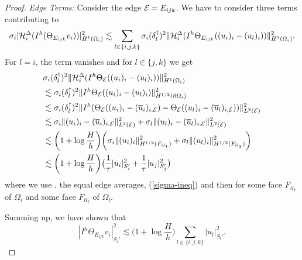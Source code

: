 \begin{proof}
    \textit{Edge Terms:} Consider the edge $\mathcal{E} = E_{ijk}$. We have to consider three terms contributing to
    \begin{equation}
        \label{full-edge}
        \sigma_i |\mathcal{H}_i^{\Delta} (I^h(\Theta_{E_{ijk}} v_i))|_{H^1(\Omega_i)}^2 \lesssim \sum_{l \in \{i,j,k\}} \sigma_i (\delta_l^{\dag})^2 \|\mathcal{H}_i^{\Delta}(I^h \Theta_{E_{ijk}}((u_i)_i - (u_l)_i))\|_{H^1(\Omega_i)}^2.
    \end{equation}
    For $l = i$, the term vanishes and for $l \in \{j,k\}$ we get
    \begin{equation*}
        \begin{split}
            & \sigma_i (\delta_l^{\dag})^2 \|\mathcal{H}_i^{\Delta}(I^h \Theta_{\mathcal{E}}((u_i)_i - (u_l)_i))\|_{H^1(\Omega_i)}^2 \\
            & \lesssim \sigma_i (\delta_l^{\dag})^2 \|I^h \Theta_{\mathcal{E}}((u_i)_i - (u_l)_i)\|_{H^{1 / 2}(\partial \Omega_i)}^2 \\
            & \lesssim \sigma_i (\delta_l^{\dag})^2 \|I^h(\Theta_{\mathcal{E}}((u_i)_i - (\overline{u}_i)_{i, \mathcal{E}}) - \Theta_{\mathcal{E}}((u_l)_i - (\overline{u}_l)_{i, \mathcal{E}}))\|_{L^2(\mathcal{E})}^2 \\
            & \lesssim \sigma_i \| (u_i)_i - (\overline{u}_i)_{i, \mathcal{E}}\|_{L^2(\mathcal{E})}^2 + \sigma_l \| (u_l)_i - (\overline{u}_l)_{i, \mathcal{E}}\|_{L^2(\mathcal{E})}^2 \\
            & \lesssim \bigg( 1 + \log \frac{H}{h}\bigg) \bigg( \sigma_i \|(u_i)_i\|_{H^{1 / 2}(F_{il_1})}^2 + \sigma_l \|(u_l)_i\|_{H^{1 / 2}(F_{ll_2})}^2\bigg) \\
            & \lesssim \bigg(1 + \log \frac{H}{h}\bigg) \big(\frac{1}{\tau}|u_i|_{S_i'}^2 + \frac{1}{\tau}|u_j|_{S_j'}^2\big)
        \end{split}
    \end{equation*}
    where we use , the equal edge averages, (\ref{sigma-ineq}) and then  for some face $F_{il_1}$ of $\Omega_i$ and some face $F_{ll_2}$ of $\Omega_l$.
    
    Summing up, we have shown that 
    \begin{equation}
        \label{edge-ineq}
        |I^h\Theta_{E_{ijk}}v_i|_{S_i'}^2 \lesssim \bigg(1 + \log \frac{H}{h}\bigg) \sum_{l \in \{i,j,k\}}|u_l|_{S_l'}^2.
    \end{equation}


\end{proof}
